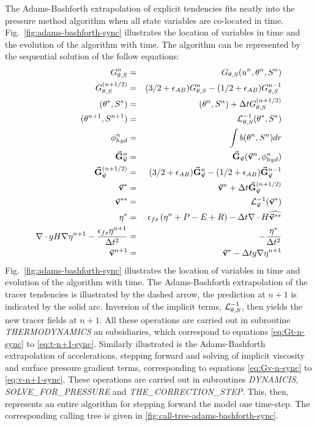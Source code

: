 The Adams-Bashforth extrapolation of explicit tendencies fits neatly
into the pressure method algorithm when all state variables are
co-located in time. Fig.~\ref{fig:adams-bashforth-sync} illustrates
the location of variables in time and the evolution of the algorithm
with time. The algorithm can be represented by the sequential solution
of the follow equations:
\begin{eqnarray}
G_{\theta,S}^{n} & = & G_{\theta,S} ( u^n, \theta^n, S^n )
\label{eq:Gt-n-sync} \\
G_{\theta,S}^{(n+1/2)} & = & (3/2+\epsilon_{AB}) G_{\theta,S}^{n}-(1/2+\epsilon_{AB}) G_{\theta,S}^{n-1}
\label{eq:Gt-n+5-sync} \\
(\theta^*,S^*) & = & (\theta^{n},S^{n}) + \Delta t G_{\theta,S}^{(n+1/2)}
\label{eq:tstar-sync} \\
(\theta^{n+1},S^{n+1}) & = & {\cal L}^{-1}_{\theta,S} (\theta^*,S^*)
\label{eq:t-n+1-sync} \\
\phi^n_{hyd} & = & \int b(\theta^n,S^n) dr
\label{eq:phi-hyd-sync} \\
\vec{\bf G}_{\vec{\bf v}}^{n} & = & \vec{\bf G}_{\vec{\bf v}} ( \vec{\bf v}^n, \phi^n_{hyd} )
\label{eq:Gv-n-sync} \\
\vec{\bf G}_{\vec{\bf v}}^{(n+1/2)} & = & (3/2 + \epsilon_{AB} ) \vec{\bf G}_{\vec{\bf v}}^{n} - (1/2 + \epsilon_{AB} ) \vec{\bf G}_{\vec{\bf v}}^{n-1}
\label{eq:Gv-n+5-sync} \\
\vec{\bf v}^{*} & = & \vec{\bf v}^{n} + \Delta t \vec{\bf G}_{\vec{\bf v}}^{(n+1/2)}
\label{eq:vstar-sync} \\
\vec{\bf v}^{**} & = & {\cal L}_{\vec{\bf v}}^{-1} ( \vec{\bf v}^* )
\label{eq:vstarstar-sync} \\
\eta^* & = & \epsilon_{fs} \left( \eta^{n} +P-E+R \right)- \Delta t 
  \nabla \cdot H \widehat{ \vec{\bf v}^{**} }
\label{eq:nstar-sync} \\
\nabla \cdot g H \nabla \eta^{n+1} - \frac{\epsilon_{fs} \eta^{n+1}}{\Delta t^2}
& = & - \frac{\eta^*}{\Delta t^2}
\label{eq:elliptic-sync} \\
\vec{\bf v}^{n+1} & = & \vec{\bf v}^{*} - \Delta t g \nabla \eta^{n+1}
\label{eq:v-n+1-sync}
\end{eqnarray}
Fig.~\ref{fig:adams-bashforth-sync} illustrates the location of
variables in time and evolution of the algorithm with time. The
Adams-Bashforth extrapolation of the tracer tendencies is illustrated
by the dashed arrow, the prediction at $n+1$ is indicated by the
solid arc. Inversion of the implicit terms, ${\cal
L}^{-1}_{\theta,S}$, then yields the new tracer fields at $n+1$. All
these operations are carried out in subroutine {\em THERMODYNAMICS} an
subsidiaries, which correspond to equations \ref{eq:Gt-n-sync} to
\ref{eq:t-n+1-sync}.
Similarly illustrated is the Adams-Bashforth extrapolation of
accelerations, stepping forward and solving of implicit viscosity and
surface pressure gradient terms, corresponding to equations
\ref{eq:Gv-n-sync} to \ref{eq:v-n+1-sync}.
These operations are carried out in subroutines {\em DYNAMCIS}, {\em
SOLVE\_FOR\_PRESSURE} and {\em THE\_CORRECTION\_STEP}. This, then,
represents an entire algorithm for stepping forward the model one
time-step. The corresponding calling tree is given in
\ref{fig:call-tree-adams-bashforth-sync}.

